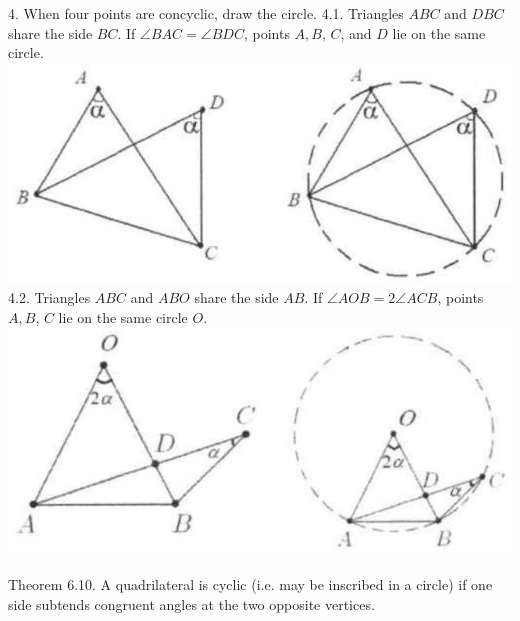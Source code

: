 \documentclass{article}
\begin{document}
4. When four points are concyclic, draw the circle.
4.1. Triangles \(A B C\) and \(D B C\) share the side \(B C\). If \(\angle B A C=\angle B D C\), points \(A, B\), \(C\), and \(D\) lie on the same circle.\\
\centering
\includegraphics[width=\textwidth]{images/191(3).jpg}\\
4.2. Triangles \(A B C\) and \(A B O\) share the side \(A B\). If \(\angle A O B=2 \angle A C B\), points \(A, B\), \(C\) lie on the same circle \(O\).\\
\centering
\includegraphics[width=\textwidth]{images/191.jpg}

Theorem 6.10. A quadrilateral is cyclic (i.e. may be inscribed in a circle) if one side subtends congruent angles at the two opposite vertices.
\end{document}
